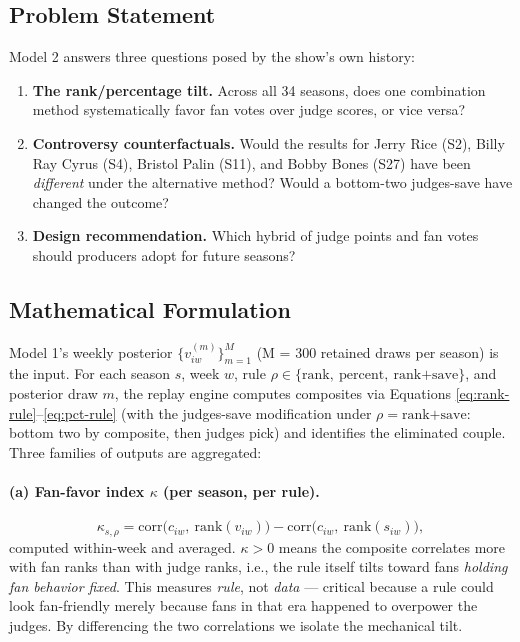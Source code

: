 \documentclass{article}
\begin{document}
\subsection{Problem Statement}

Model 2 answers three questions posed by the show's own history:
\begin{enumerate}
  \item \textbf{The rank/percentage tilt.} Across all 34 seasons, does one combination method systematically favor fan votes over judge scores, or vice versa?
  \item \textbf{Controversy counterfactuals.} Would the results for Jerry Rice (S2), Billy Ray Cyrus (S4), Bristol Palin (S11), and Bobby Bones (S27) have been \emph{different} under the alternative method? Would a bottom-two judges-save have changed the outcome?
  \item \textbf{Design recommendation.} Which hybrid of judge points and fan votes should producers adopt for future seasons?
\end{enumerate}

\subsection{Mathematical Formulation}

Model 1's weekly posterior $\{v^{(m)}_{iw}\}_{m=1}^{M}$ (M = 300 retained draws per season) is the input. For each season $s$, week $w$, rule $\rho \in \{\text{rank},\ \text{percent},\ \text{rank+save}\}$, and posterior draw $m$, the replay engine computes composites via Equations \eqref{eq:rank-rule}--\eqref{eq:pct-rule} (with the judges-save modification under $\rho = \text{rank+save}$: bottom two by composite, then judges pick) and identifies the eliminated couple. Three families of outputs are aggregated:

\paragraph{(a) Fan-favor index $\kappa$ (per season, per rule).}
\begin{equation}
\kappa_{s,\rho} = \mathrm{corr}\big(c_{iw},\ \mathrm{rank}(v_{iw})\big) - \mathrm{corr}\big(c_{iw},\ \mathrm{rank}(s_{iw})\big),
\label{eq:kappa}
\end{equation}
computed within-week and averaged. $\kappa > 0$ means the composite correlates more with fan ranks than with judge ranks, i.e., the rule itself tilts toward fans \emph{holding fan behavior fixed}. This measures \emph{rule}, not \emph{data} --- critical because a rule could look fan-friendly merely because fans in that era happened to overpower the judges. By differencing the two correlations we isolate the mechanical tilt.
\end{document}
